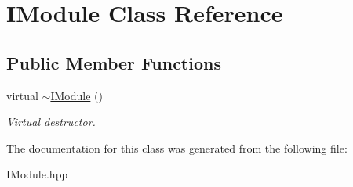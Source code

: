 \hypertarget{class_i_module}{}\section{I\+Module Class Reference}
\label{class_i_module}
\subsection*{Public Member Functions}
\begin{DoxyCompactItemize}
\item 
\hypertarget{class_i_module_a4594ddd506db5d8270d970d55875a8e9}{}virtual \hyperlink{class_i_module_a4594ddd506db5d8270d970d55875a8e9}{$\sim$\+I\+Module} ()\label{class_i_module_a4594ddd506db5d8270d970d55875a8e9}

\begin{DoxyCompactList}\small\item\em Virtual destructor. \end{DoxyCompactList}\end{DoxyCompactItemize}


The documentation for this class was generated from the following file\+:\begin{DoxyCompactItemize}
\item 
I\+Module.\+hpp\end{DoxyCompactItemize}
